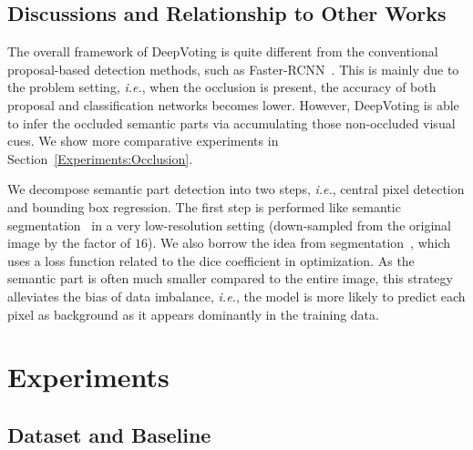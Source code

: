 \documentclass[10pt,twocolumn,letterpaper]{article}
\begin{document}
  \subsection{Discussions and Relationship to Other Works}
  \label{Framework:Discussions}

  The overall framework of DeepVoting is quite different from the conventional proposal-based detection methods, such as Faster-RCNN~\cite{Ren_2015_Faster}. This is mainly due to the problem setting, {\em i.e.}, when the occlusion is present, the accuracy of both proposal and classification networks becomes lower. However, DeepVoting is able to infer the occluded semantic parts via accumulating those non-occluded visual cues. We show more comparative experiments in Section~\ref{Experiments:Occlusion}.

  We decompose semantic part detection into two steps, {\em i.e.}, central pixel detection and bounding box regression. The first step is performed like semantic segmentation~\cite{Long_2015_Fully} in a very low-resolution setting (down-sampled from the original image by the factor of $16$). We also borrow the idea from segmentation~\cite{Milletari_2016_V}, which uses a loss function related to the dice coefficient in optimization. As the semantic part is often much smaller compared to the entire image, this strategy alleviates the bias of data imbalance, {\em i.e.}, the model is more likely to predict each pixel as background as it appears dominantly in the training data.


  \section{Experiments}
  \label{Experiments}

  \subsection{Dataset and Baseline}
  \label{Experiments:Settings}
\end{document}
